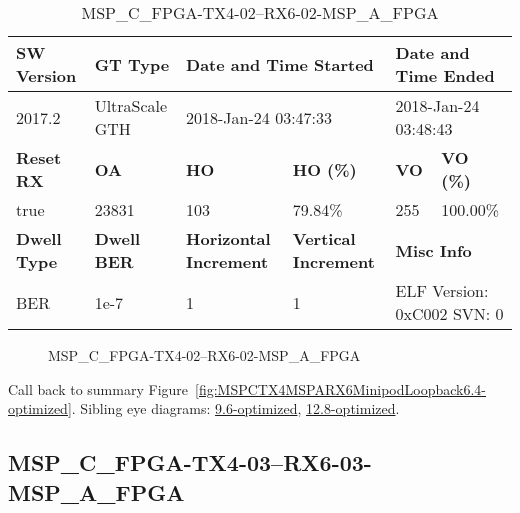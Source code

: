 \begin{table}[h]
\centering
\caption{MSP\_C\_FPGA-TX4-02--RX6-02-MSP\_A\_FPGA}
\label{tab:MSPCFPGATX402RX602MSPAFPGA6.4-optimized}
\begin{tabular}{@{}|l|l|l|l|l|l|@{}}
\toprule
\textbf{SW Version}                & \textbf{GT Type}   & \multicolumn{2}{l|}{\textbf{Date and Time Started}}            & \multicolumn{2}{l|}{\textbf{Date and Time Ended}}        \\ \midrule
2017.2                       & UltraScale GTH          & \multicolumn{2}{l|}{2018-Jan-24 03:47:33}                   & \multicolumn{2}{l|}{2018-Jan-24 03:48:43}               \\ \midrule
\textbf{Reset RX}                  & \textbf{OA} & \textbf{HO}   & \textbf{HO (\%)} & \textbf{VO} & \textbf{VO (\%)} \\ \midrule
true & 23831        & 103          & 79.84\%        & 255        & 100.00\%       \\ \midrule
\textbf{Dwell Type}                & \textbf{Dwell BER} & \textbf{Horizontal Increment} & \textbf{Vertical Increment}    & \multicolumn{2}{l|}{\textbf{Misc Info}}                  \\ \midrule
BER                            & 1e-7        & 1        & 1           & \multicolumn{2}{l|}{ELF Version: 0xC002 SVN: 0}                         \\ \bottomrule
\end{tabular}
\end{table}

\begin{figure}[h]
\caption{MSP\_C\_FPGA-TX4-02--RX6-02-MSP\_A\_FPGA} \label{fig:MSPCFPGATX402RX602MSPAFPGA6.4-optimized}
\end{figure}

Call back to summary Figure~\ref{fig:MSPCTX4MSPARX6MinipodLoopback6.4-optimized}.
Sibling eye diagrams: \hyperref[sec:MSPCFPGATX402RX602MSPAFPGA9.6-optimized]{9.6-optimized}, \hyperref[sec:MSPCFPGATX402RX602MSPAFPGA12.8-optimized]{12.8-optimized}.

\clearpage
\newpage


\subsection{MSP\_C\_FPGA-TX4-03--RX6-03-MSP\_A\_FPGA}\label{sec:MSPCFPGATX403RX603MSPAFPGA6.4-optimized}

